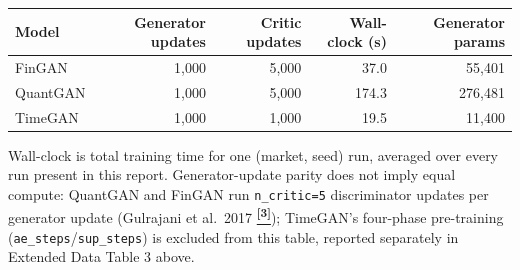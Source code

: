 \documentclass[10pt]{article}
\newcommand{\tcite}[1]{%
  \hyperlink{R:#1}{\textsuperscript{\scriptsize\textbf{[#1]}}}}
\begin{document}
\vspace{4pt}
{\small
\begin{tabular}{@{}lrrrr@{}}
\toprule
Model & Generator updates & Critic updates & Wall-clock (s) & Generator params \\
\midrule
FinGAN & 1,000 & 5,000 & 37.0 & 55,401 \\
QuantGAN & 1,000 & 5,000 & 174.3 & 276,481 \\
TimeGAN & 1,000 & 1,000 & 19.5 & 11,400 \\
\bottomrule
\end{tabular}}

\smallskip
{\small Wall-clock is total training time for one (market, seed) run, averaged over every run present in this report. Generator-update parity does not imply equal compute: QuantGAN and FinGAN run \texttt{n\_critic=5} discriminator updates per generator update (Gulrajani et al.\ 2017\tcite{3}); TimeGAN's four-phase pre-training (\texttt{ae\_steps}/\texttt{sup\_steps}) is excluded from this table, reported separately in Extended Data Table 3 above.}
\end{document}
